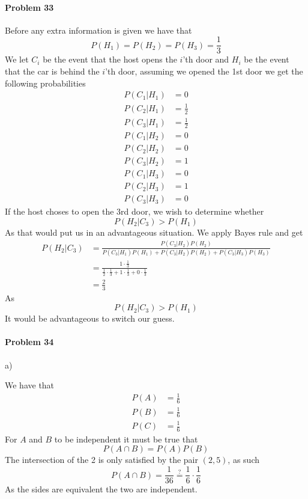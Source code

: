 \paragraph{Problem 33}
Before any extra information is given we have that
\[
    P(H_{1})=P(H_{2})=P(H_{3})=\frac{1}{3}
\]
We let $C_{i}$ be the event that the host opens the $i$'th door and $H_{i}$ be the event that the car is behind the $i$'th door, assuming we opened the 1st door we get the following probabilities
\begin{align*}
    P(C_{1}|H_{1})&=0 \\
    P(C_{2}|H_{1})&=\frac{1}{2} \\
    P(C_{3}|H_{1})&=\frac{1}{2} \\
    P(C_{1}|H_{2})&=0 \\
    P(C_{2}|H_{2})&=0 \\
    P(C_{3}|H_{2})&=1 \\
    P(C_{1}|H_{3})&=0 \\
    P(C_{2}|H_{3})&=1 \\
    P(C_{3}|H_{3})&=0
\end{align*}
If the host choses to open the 3rd door, we wish to determine whether
\[
    P(H_{2}|C_{3})>P(H_{1})
\]
As that would put us in an advantageous situation. We apply Bayes rule and get
\begin{align*}
    P(H_{2}|C_{3})&=\frac{P(C_{3}|H_{2})P(H_{2})}{P(C_{3}|H_{1})P(H_{1})+P(C_{3}|H_{2})P(H_{2})+P(C_{3}|H_{3})P(H_{3})} \\
            &=\frac{1\cdot\frac{1}{3}}{\frac{1}{2}\cdot\frac{1}{3}+1\cdot\frac{1}{3}+0\cdot\frac{1}{3}} \\
            &=\frac{2}{3}
\end{align*}
As
\[
    P(H_{2}|C_{3})>P(H_{1})
\]
It would be advantageous to switch our guess.
\paragraph{Problem 34}
a)

We have that
\begin{align*}
    P(A)&=\frac{1}{6} \\
    P(B)&=\frac{1}{6} \\
    P(C)&=\frac{1}{6}
\end{align*}
For $A$ and $B$ to be independent it must be true that
\[
    P(A\cap B)=P(A)P(B)
\]
The intersection of the 2 is only satisfied by the pair $(2,5)$, as such
\[
    P(A\cap B)=\frac{1}{36}\stackrel{?}{=}\frac{1}{6}\cdot\frac{1}{6}
\]
As the sides are equivalent the two are independent.

